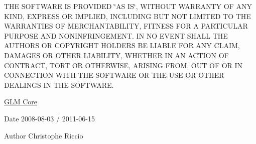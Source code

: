 T\-H\-E S\-O\-F\-T\-W\-A\-R\-E I\-S P\-R\-O\-V\-I\-D\-E\-D \char`\"{}\-A\-S I\-S\char`\"{}, W\-I\-T\-H\-O\-U\-T W\-A\-R\-R\-A\-N\-T\-Y O\-F A\-N\-Y K\-I\-N\-D, E\-X\-P\-R\-E\-S\-S O\-R I\-M\-P\-L\-I\-E\-D, I\-N\-C\-L\-U\-D\-I\-N\-G B\-U\-T N\-O\-T L\-I\-M\-I\-T\-E\-D T\-O T\-H\-E W\-A\-R\-R\-A\-N\-T\-I\-E\-S O\-F M\-E\-R\-C\-H\-A\-N\-T\-A\-B\-I\-L\-I\-T\-Y, F\-I\-T\-N\-E\-S\-S F\-O\-R A P\-A\-R\-T\-I\-C\-U\-L\-A\-R P\-U\-R\-P\-O\-S\-E A\-N\-D N\-O\-N\-I\-N\-F\-R\-I\-N\-G\-E\-M\-E\-N\-T. I\-N N\-O E\-V\-E\-N\-T S\-H\-A\-L\-L T\-H\-E A\-U\-T\-H\-O\-R\-S O\-R C\-O\-P\-Y\-R\-I\-G\-H\-T H\-O\-L\-D\-E\-R\-S B\-E L\-I\-A\-B\-L\-E F\-O\-R A\-N\-Y C\-L\-A\-I\-M, D\-A\-M\-A\-G\-E\-S O\-R O\-T\-H\-E\-R L\-I\-A\-B\-I\-L\-I\-T\-Y, W\-H\-E\-T\-H\-E\-R I\-N A\-N A\-C\-T\-I\-O\-N O\-F C\-O\-N\-T\-R\-A\-C\-T, T\-O\-R\-T O\-R O\-T\-H\-E\-R\-W\-I\-S\-E, A\-R\-I\-S\-I\-N\-G F\-R\-O\-M, O\-U\-T O\-F O\-R I\-N C\-O\-N\-N\-E\-C\-T\-I\-O\-N W\-I\-T\-H T\-H\-E S\-O\-F\-T\-W\-A\-R\-E O\-R T\-H\-E U\-S\-E O\-R O\-T\-H\-E\-R D\-E\-A\-L\-I\-N\-G\-S I\-N T\-H\-E S\-O\-F\-T\-W\-A\-R\-E.

\hyperlink{group__core}{G\-L\-M Core}

\begin{DoxyDate}{Date}
2008-\/08-\/03 / 2011-\/06-\/15 
\end{DoxyDate}
\begin{DoxyAuthor}{Author}
Christophe Riccio 
\end{DoxyAuthor}

